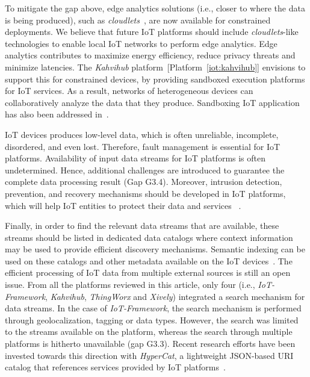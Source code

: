 \documentclass[preprint,10pt,5p]{elsarticle}
\newcommand{\citeiot}[1]{[Platform~\ref{#1}]}
\begin{document}
To mitigate the gap above, edge analytics solutions
(i.e., closer to where the data is being produced), 
such as \emph{cloudlets}~\cite{Lewis2014}, are now available for 
constrained deployments. We believe that future IoT platforms should include
\emph{cloudlets}-like technologies to enable local IoT networks to perform
edge analytics. 
Edge analytics contributes to maximize energy efficiency, reduce
privacy threats and minimize latencies. 
The \emph{Kahvihub} platform~\citeiot{iot:kahvihub} envisions to
support this for constrained devices, by providing sandboxed
execution platforms for IoT services. As a result, networks of
heterogeneous devices can collaboratively analyze the data that they
produce. 
Sandboxing IoT application has also been addressed in~\cite{Kovatsch2012}.

IoT devices produces low-level data, which is often
unreliable, incomplete, disordered, and even lost. 
Therefore, fault management is essential for IoT platforms.
Availability of input data streams for IoT platforms is often undetermined. 
Hence, additional challenges are introduced to guarantee the  complete data processing result (Gap G3.4). Moreover, intrusion detection, prevention, and recovery mechanisms should be developed in IoT platforms, which will help IoT entities to protect their data and services ~\cite{Roman2013}.

Finally, in order to find the relevant data streams that are available, these
streams should be listed in dedicated data catalogs where context information may be
used to provide efficient discovery mechanisms. 
Semantic indexing can be used on these catalogs and other metadata available on the
IoT devices~\cite{He2012}. The efficient processing of IoT data
from multiple external sources is still an open issue.
From all the platforms reviewed in this article, only four (i.e.,
\emph{IoT-Framework}, \emph{Kahvihub}, \emph{ThingWorx} and
\emph{Xively}) integrated a search mechanism for data streams. 
In the case of \emph{IoT-Framework}, the search mechanism
is performed through geolocalization, tagging or data types.
However, the search was limited to the streams available on the platform, 
whereas the search through multiple platforms is hitherto unavailable (gap G3.3). 
Recent research efforts have been invested towards this direction with
\emph{HyperCat}, a lightweight JSON-based URI catalog that references services
provided by IoT platforms~\cite{Lea2014a}.
\end{document}
